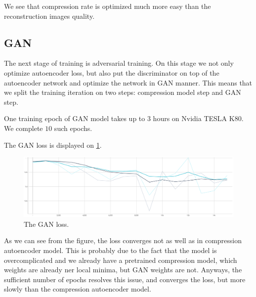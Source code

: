 We see that compression rate is optimized much more easy than the reconstruction images quality.

\subsection{GAN}

The next stage of training is adversarial training. On this stage we not only optimize autoencoder loss, but also put the discriminator on top of the autoencoder network and optimize the network in GAN manner. This means that we split the training iteration on two steps: compression model step and GAN step.

One training epoch of GAN model takes up to $3$ hours on Nvidia TESLA K80. We complete $10$ such epochs.

The GAN loss is displayed on \ref{training-compression-gan-discriminator}.

\begin{figure}[!ht]
    \centering
    \includegraphics[width=\textwidth]{figure/compression-gan-discriminator.png}
    \caption{The GAN loss.}
    \label{training-compression-gan-discriminator}
\end{figure}

As we can see from the figure, the loss converges not as well as in compression autoencoder model. This is probably due to the fact that the model is overcomplicated and we already have a pretrained compression model, which weights are already ner local minima, but GAN weights are not. Anyways, the sufficient number of epochs resolves this issue, and converges the loss, but more slowly than the compression autoencoder model.

